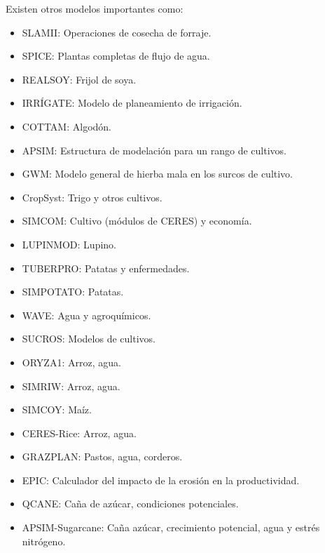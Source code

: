 Existen otros modelos importantes como: \parencite{hernandez2009modelos}
\begin{itemize}
	\item SLAMII: Operaciones de cosecha de forraje.
	\item SPICE: Plantas completas de flujo de agua.
	\item REALSOY: Frijol de soya.
	\item IRRÍGATE: Modelo de planeamiento de irrigación.
	\item COTTAM: Algodón.
	\item APSIM: Estructura de modelación para un rango de cultivos.
	\item GWM: Modelo general de hierba mala en los surcos de cultivo.
	\item CropSyst: Trigo y otros cultivos.
	\item SIMCOM: Cultivo (módulos de CERES) y economía.
	\item LUPINMOD: Lupino.
	\item TUBERPRO: Patatas y enfermedades.
	\item SIMPOTATO: Patatas.
	\item WAVE: Agua y agroquímicos.
	\item SUCROS: Modelos de cultivos.
	\item ORYZA1: Arroz, agua.
	\item SIMRIW: Arroz, agua.
	\item SIMCOY: Maíz.
	\item CERES-Rice: Arroz, agua.
	\item GRAZPLAN: Pastos, agua, corderos.
	\item EPIC: Calculador del impacto de la erosión en la productividad.
	\item QCANE: Caña de azúcar, condiciones potenciales.
	\item APSIM-Sugarcane: Caña azúcar, crecimiento potencial, agua y estrés nitrógeno.
\end{itemize}










